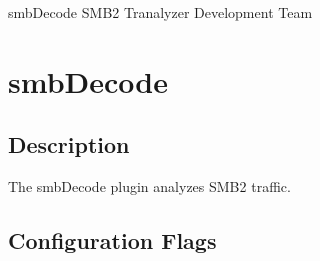 \documentclass[documentation]{subfiles}
\begin{document}
\trantitle
    {smbDecode}
    {SMB2}
    {Tranalyzer Development Team} %

\section{smbDecode}\label{s:smbDecode}

\subsection{Description}
The smbDecode plugin analyzes SMB2 traffic.







\subsection{Configuration Flags}
\end{document}
